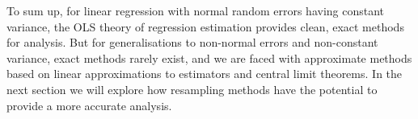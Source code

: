 \bigskip
To sum up, for linear regression with normal random errors having constant variance, the OLS theory of regression estimation provides clean, exact methods for analysis. But for generalisations to non-normal errors and non-constant variance, exact methods rarely exist, and we are faced with approximate methods based on linear approximations to estimators and central limit theorems. In the next section we will explore how resampling methods have the potential to provide a more accurate analysis.
